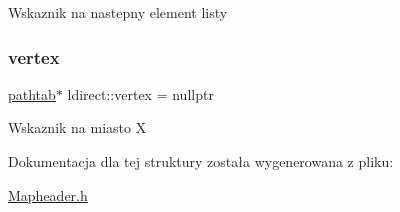 Wskaznik na nastepny element listy \mbox{\label{structldirect_add97b81de6ff01404d84a910b25ee193}} 
\subsubsection{\texorpdfstring{vertex}{vertex}}
{\footnotesize\ttfamily \mbox{\hyperlink{structpathtab}{pathtab}}$\ast$ ldirect\+::vertex = nullptr}

Wskaznik na miasto X 

Dokumentacja dla tej struktury została wygenerowana z pliku\+:\begin{DoxyCompactItemize}
\item 
\mbox{\hyperlink{_mapheader_8h}{Mapheader.\+h}}\end{DoxyCompactItemize}

